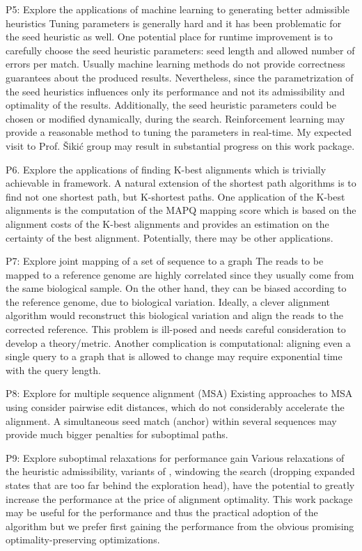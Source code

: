 P5: Explore the applications of machine learning to generating better admissible
heuristics Tuning parameters is generally hard and it has been problematic for
the seed heuristic as well. One potential place for runtime improvement is to
carefully choose the seed heuristic parameters: seed length and allowed number
of errors per match. Usually machine learning methods do not provide correctness
guarantees about the produced results. Nevertheless, since the parametrization
of the seed heuristics influences only its performance and not its admissibility
and optimality of the results. Additionally, the seed heuristic parameters could
be chosen or modified dynamically, during the \A search. Reinforcement learning
may provide a reasonable method to tuning the parameters in real-time. My
expected visit to Prof. Šikić group may result in substantial progress on this
work package.

P6. Explore the applications of finding K-best alignments which is trivially
achievable in \A framework. A natural extension of the shortest path algorithms
is to find not one shortest path, but K-shortest paths. One application of the
K-best alignments is the computation of the MAPQ mapping score which is based on
the alignment costs of the K-best alignments and provides an estimation on the
certainty of the best alignment. Potentially, there may be other applications.

P7: Explore joint mapping of a set of sequence to a graph The reads to be mapped
to a reference genome are highly correlated since they usually come from the
same biological sample. On the other hand, they can be biased according to the
reference genome, due to biological variation. Ideally, a clever alignment
algorithm would reconstruct this biological variation and align the reads to the
corrected reference. This problem is ill-posed and needs careful consideration
to develop a theory/metric. Another complication is computational: aligning even
a single query to a graph that is allowed to change may require exponential time
with the query length.

P8: Explore \A for multiple sequence alignment (MSA) Existing approaches to MSA
using \A consider pairwise edit distances, which do not considerably accelerate
the alignment. A simultaneous seed match (anchor) within several sequences may
provide much bigger penalties for suboptimal paths.

P9: Explore suboptimal relaxations for performance gain Various relaxations of
the heuristic admissibility, variants of \A, windowing the search (dropping
expanded states that are too far behind the exploration head), have the
potential to greatly increase the performance at the price of alignment
optimality. This work package may be useful for the performance and thus the
practical adoption of the algorithm but we prefer first gaining the performance
from the obvious promising optimality-preserving optimizations.

